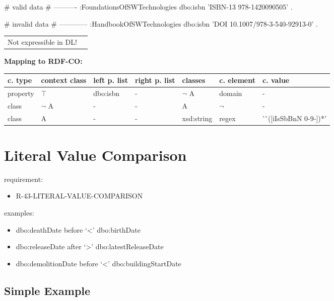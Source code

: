 \documentclass{llncs}
\newenvironment{gcotable}{
  \scriptsize
  \sffamily
  \vspace{0cm}
	\begin{center}
	\textbf{\vspace{0.4cm}Mapping to RDF-CO:} \\
  \begin{tabular}{l|l|l|l|l|l|l}
	\hline
  \textbf{c. type} & \textbf{context class} & \textbf{left p. list} & \textbf{right p. list} & \textbf{classes} & \textbf{c. element} & \textbf{c. value} \\
  \hline

}{
  \hline
  \end{tabular}
	\end{center}
}
\newenvironment{DL}{
  \vspace{0cm}
	\begin{center}
  \begin{tabular}{r l}

}{
  \end{tabular}
	\end{center}
}
\begin{document}
\begin{ex}
# valid data
# ----------
:FoundationsOfSWTechnologies
    dbo:isbn 'ISBN-13 978-1420090505' .
\end{ex}

\begin{ex}
# invalid data
# ------------
:HandbookOfSWTechnologies
    dbo:isbn 'DOI 10.1007/978-3-540-92913-0' .
\end{ex}

\begin{DL}
Not expressible in DL!
\end{DL}

\begin{gcotable}
property & $\top$ & dbo:isbn & - & $\neg$ A & domain & - \\
class & $\neg$ A & - & - & A & $\neg$ & - \\
class & A & - & - & xsd:string & regex & 'ˆ([iIsSbBnN 0-9-])*$' $ \\
\end{gcotable}

\section{Literal Value Comparison}

requirement:

\begin{itemize}
	\item R-43-LITERAL-VALUE-COMPARISON
\end{itemize}



examples:

\begin{itemize}
	\item dbo:deathDate before ‘<’ dbo:birthDate
  \item dbo:releaseDate after ‘>’ dbo:latestReleaseDate
  \item dbo:demolitionDate before ‘<’ dbo:buildingStartDate
\end{itemize}

\subsection{Simple Example}

\end{document}
